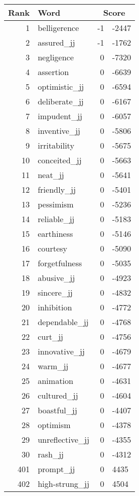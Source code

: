 \begin{longtable}[!htbp]{| rlr@{.}l |}
    \hline
    \textbf{Rank} & \textbf{Word} & \multicolumn{2}{c|}{\textbf{Score}} \\
    \hline
    \endhead
    1 & belligerence & -1 & -2447 \\
    2 & assured\_jj & -1 & -1762 \\
    3 & negligence & 0 & -7320 \\
    4 & assertion & 0 & -6639 \\
    5 & optimistic\_jj & 0 & -6594 \\
    6 & deliberate\_jj & 0 & -6167 \\
    7 & impudent\_jj & 0 & -6057 \\
    8 & inventive\_jj & 0 & -5806 \\
    9 & irritability & 0 & -5675 \\
    10 & conceited\_jj & 0 & -5663 \\
    11 & neat\_jj & 0 & -5641 \\
    12 & friendly\_jj & 0 & -5401 \\
    13 & pessimism & 0 & -5236 \\
    14 & reliable\_jj & 0 & -5183 \\
    15 & earthiness & 0 & -5146 \\
    16 & courtesy & 0 & -5090 \\
    17 & forgetfulness & 0 & -5035 \\
    18 & abusive\_jj & 0 & -4923 \\
    19 & sincere\_jj & 0 & -4832 \\
    20 & inhibition & 0 & -4772 \\
    21 & dependable\_jj & 0 & -4768 \\
    22 & curt\_jj & 0 & -4756 \\
    23 & innovative\_jj & 0 & -4679 \\
    24 & warm\_jj & 0 & -4677 \\
    25 & animation & 0 & -4631 \\
    26 & cultured\_jj & 0 & -4604 \\
    27 & boastful\_jj & 0 & -4407 \\
    28 & optimism & 0 & -4378 \\
    29 & unreflective\_jj & 0 & -4355 \\
    30 & rash\_jj & 0 & -4312 \\
    401 & prompt\_jj & 0 & 4435 \\
    402 & high-strung\_jj & 0 & 4504 \\

\end{longtable}

